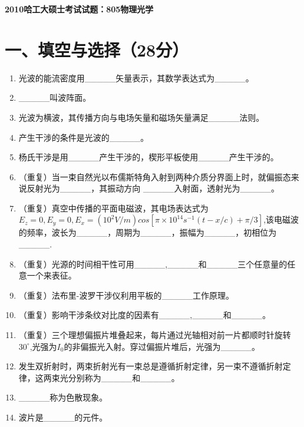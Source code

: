 \documentclass[12pt, a4paper]{article}
\theoremstyle{solution}
\begin{document}
\begin{center}
\Large\textbf{2010哈工大硕士考试试题：805物理光学}
\end{center}




\section*{一、填空与选择（28分）}
\begin{enumerate}
    \item 光波的能流密度用\_\_\_\_\_矢量表示，其数学表达式为\_\_\_\_\_。
    \item \_\_\_\_\_叫波阵面。
    \item 光波为横波，其传播方向与电场矢量和磁场矢量满足\_\_\_\_\_法则。
    \item 产生干涉的条件是光波的\_\_\_\_\_。
    \item 杨氏干涉是用\_\_\_\_\_产生干涉的，楔形平板使用\_\_\_\_\_产生干涉的。
    \item （重复）当一束自然光以布儒斯特角入射到两种介质分界面上时，就偏振态来说反射光为\_\_\_\_\_，其振动方向 \_\_\_\_\_入射面，透射光为\_\_\_\_\_。
    \item （重复）真空中传播的平面电磁波，其电场表达式为$E_z=0,E_y=0,E_x=(10^2V/m)cos[\pi\times10^{14}s^{-1}(t-x/c)+\pi/3]$,该电磁波的频率，波长为\_\_\_\_\_，周期为\_\_\_\_\_，振幅为\_\_\_\_\_，初相位为\_\_\_\_\_.
    \item （重复）光源的时间相干性可用\_\_\_\_\_,\_\_\_\_\_和\_\_\_\_\_三个任意量的任意一个来表征。
    \item （重复）法布里-波罗干涉仪利用平板的\_\_\_\_\_工作原理。
    \item （重复）影响干涉条纹对比度的因素有\_\_\_\_\_,\_\_\_\_\_和\_\_\_\_\_。
    \item （重复）三个理想偏振片堆叠起来，每片通过光轴相对前一片都顺时针旋转$30^\circ$,光强为$I_0$的非偏振光入射。穿过偏振片堆后，光强为\_\_\_\_\_。
    \item 发生双折射时，两束折射光有一束总是遵循折射定律，另一束不遵循折射定律，这两束光分别称为\_\_\_\_\_和\_\_\_\_\_。
    \item \_\_\_\_\_称为色散现象。
    \item 波片是\_\_\_\_\_的元件。
\end{enumerate}
\end{document}
